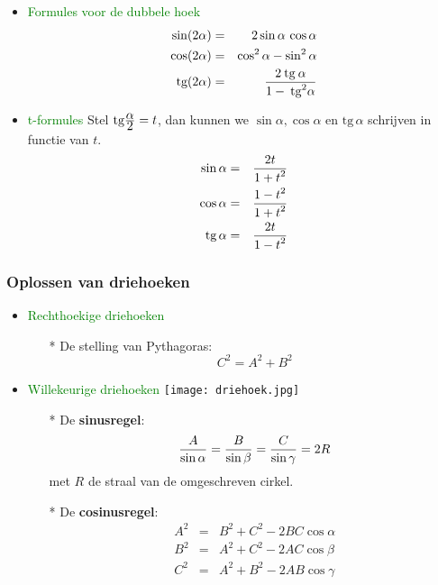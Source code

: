 \begin{itemize}
\item \textcolor{green}{\hypertarget{dubbele_hoek}{Formules voor de dubbele hoek}}\label{dubbele_hoek}
\begin{eqnarray*}
\sin(2\alpha)&=&2\sin\alpha\,\cos\alpha\\
\cos(2\alpha)&=&\cos^2\alpha - \sin^2\alpha\\
\mbox{tg}(2\alpha)&=&\displaystyle\frac{\displaystyle 2\:\mbox{tg}\:\alpha}{\displaystyle 1-\:\mbox{tg}^2\alpha}
\end{eqnarray*}
\item \textcolor{green}{\hypertarget{t-formules}{t-formules}}\label{t-formules}\newline
Stel $\mbox{tg}\frac{\displaystyle \alpha}{\displaystyle 2}=t$, dan kunnen we $\sin\alpha, \cos\alpha$ en 	$\mbox{tg}\,\alpha$ schrijven in functie van $t$.
\begin{eqnarray*}
\sin\alpha&=&\frac{\displaystyle 2t}{\displaystyle 1+t^2}\\
\cos\alpha&=&\frac{\displaystyle 1-t^2}{\displaystyle 1+t^2}\\
\mbox{tg}\,\alpha&=&\frac{\displaystyle 2t}{\displaystyle 1-t^2}
\end{eqnarray*}
\end{itemize}

\subsubsection{Oplossen van driehoeken} \label{oplossen_driehoeken}
\hypertarget{oplossen_driehoeken}{}
	\begin{itemize}%
	\item \textcolor{green}{Rechthoekige driehoeken}
		\begin{itemize}%
		\item[*]De stelling van Pythagoras:
		\[C^2=A^2+B^2\]
		\end{itemize}%
	\item \textcolor{green}{Willekeurige driehoeken}\newline
                \texttt{[image: driehoek.jpg]}
		\begin{itemize}%
		\item[*] De \hypertarget{sinusregel}{{\bf sinusregel}}:\label{sinusregel}
		\[\displaystyle\frac{\displaystyle A}{\displaystyle \sin\alpha}=\displaystyle\frac{\displaystyle B}{\displaystyle \sin\beta}=\displaystyle\frac{\displaystyle C}{\displaystyle \sin\gamma}=2R\]
		met $R$ de straal van de omgeschreven cirkel.\newline
		\item[*] De \hypertarget{cosinusregel}{{\bf cosinusregel}}:\label{cosinusregel}
		\begin{eqnarray*}
		A^2&=&B^2+C^2-2BC\cos\alpha\\
		B^2&=&A^2+C^2-2AC\cos\beta\\
		C^2&=&A^2+B^2-2AB\cos\gamma
		\end{eqnarray*}
		\end{itemize}%
	\end{itemize}%


